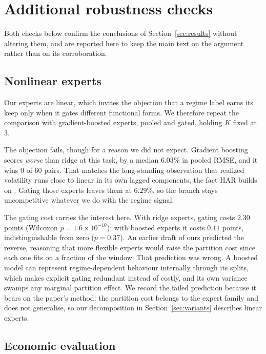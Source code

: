 \documentclass[sigconf,nonacm]{acmart}
\begin{document}
\section{Additional robustness checks}
\label{sec:appendix}

Both checks below confirm the conclusions of Section~\ref{sec:results} without altering them, and are reported here to keep the main text on the argument rather than on its corroboration.

\subsection{Nonlinear experts}
\label{sec:nonlinear}

Our experts are linear, which invites the objection that a regime label earns its
keep only when it gates different functional forms. We therefore repeat the
comparison with gradient-boosted experts, pooled and gated, holding $K$ fixed at
3.

The objection fails, though for a reason we did not expect. Gradient boosting
scores \emph{worse} than ridge at this task, by a median $6.03\%$ in pooled RMSE,
and it wins $0$ of $60$ pairs. That matches the long-standing observation that
realized volatility runs close to linear in its own lagged components, the fact
HAR builds on \cite{corsi2009}. Gating those experts leaves them at $6.29\%$, so
the branch stays uncompetitive whatever we do with the regime signal.

The gating cost carries the interest here. With ridge experts, gating costs
$2.30$ points (Wilcoxon $p = 1.6\times10^{-10}$); with boosted experts it costs
$0.11$ points, indistinguishable from zero ($p = 0.37$). An earlier draft of ours
predicted the reverse, reasoning that more flexible experts would raise the
partition cost since each one fits on a fraction of the window. That prediction
was wrong. A boosted model can represent regime-dependent behaviour internally
through its splits, which makes explicit gating redundant instead of costly, and
its own variance swamps any marginal partition effect. We record the failed
prediction because it bears on the paper's method: the partition cost belongs to
the expert family and does not generalise, so our decomposition in
Section~\ref{sec:variants} describes linear experts.

\subsection{Economic evaluation}
\label{sec:economic}
\end{document}
